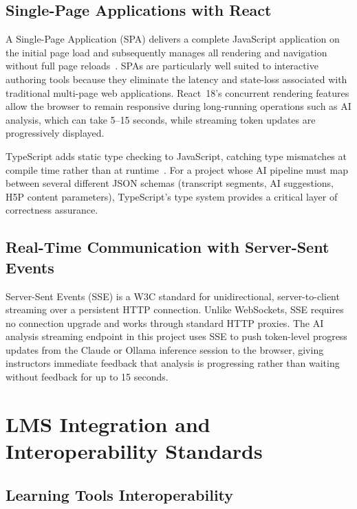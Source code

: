 \subsection{Single-Page Applications with React}

A Single-Page Application (SPA) delivers a complete JavaScript application
on the initial page load and subsequently manages all rendering and
navigation without full page reloads~\cite{react2023}. SPAs are particularly
well suited to interactive authoring tools because they eliminate the latency
and state-loss associated with traditional multi-page web applications.
React~18's concurrent rendering features allow the browser to remain
responsive during long-running operations such as AI analysis, which can
take 5--15 seconds, while streaming token updates are progressively displayed.

TypeScript adds static type checking to JavaScript, catching type mismatches
at compile time rather than at runtime~\cite{typescript2023}. For a project
whose AI pipeline must map between several different JSON schemas (transcript
segments, AI suggestions, H5P content parameters), TypeScript's type system
provides a critical layer of correctness assurance.

\subsection{Real-Time Communication with Server-Sent Events}

Server-Sent Events (SSE) is a W3C standard for unidirectional,
server-to-client streaming over a persistent HTTP connection. Unlike
WebSockets, SSE requires no connection upgrade and works through standard
HTTP proxies. The AI analysis streaming endpoint in this project uses SSE
to push token-level progress updates from the Claude or Ollama inference
session to the browser, giving instructors immediate feedback that analysis
is progressing rather than waiting without feedback for up to 15 seconds.

\section{LMS Integration and Interoperability Standards}

\subsection{Learning Tools Interoperability}

